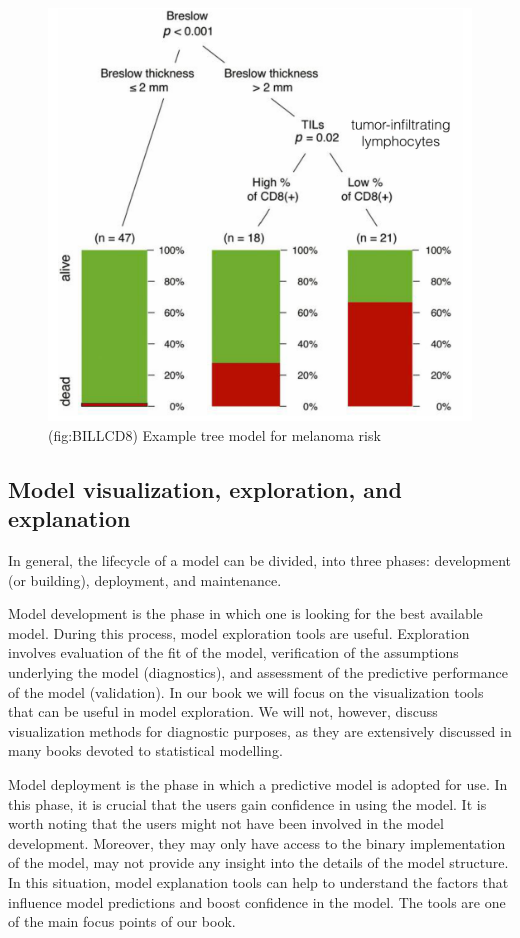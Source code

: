\documentclass[12pt,]{krantz}
\theoremstyle{definition}
\theoremstyle{definition}
\theoremstyle{definition}
\theoremstyle{remark}
\begin{document}
\begin{figure}

{\centering \includegraphics[width=0.5\linewidth]{figure/wbBILL8model} 

}

\caption{(fig:BILLCD8) Example tree model for melanoma risk}\label{fig:BILLCD8}
\end{figure}

\hypertarget{model-visualization-exploration-and-explanation}{%
\subsection{Model visualization, exploration, and
explanation}\label{model-visualization-exploration-and-explanation}}

In general, the lifecycle of a model can be divided, into three phases:
development (or building), deployment, and maintenance.

Model development is the phase in which one is looking for the best
available model. During this process, model exploration tools are
useful. Exploration involves evaluation of the fit of the model,
verification of the assumptions underlying the model (diagnostics), and
assessment of the predictive performance of the model (validation). In
our book we will focus on the visualization tools that can be useful in
model exploration. We will not, however, discuss visualization methods
for diagnostic purposes, as they are extensively discussed in many books
devoted to statistical modelling.

Model deployment is the phase in which a predictive model is adopted for
use. In this phase, it is crucial that the users gain confidence in
using the model. It is worth noting that the users might not have been
involved in the model development. Moreover, they may only have access
to the binary implementation of the model, may not provide any insight
into the details of the model structure. In this situation, model
explanation tools can help to understand the factors that influence
model predictions and boost confidence in the model. The tools are one
of the main focus points of our book.
\end{document}
